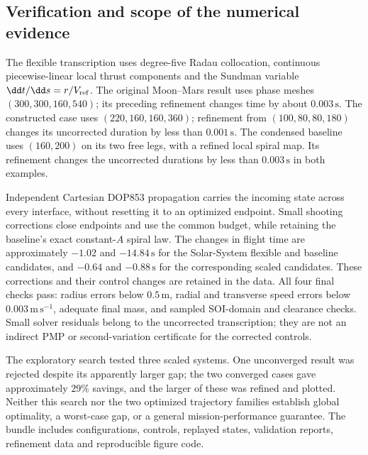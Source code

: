 \subsection{Verification and scope of the numerical evidence}
The flexible transcription uses degree-five Radau collocation, continuous piecewise-linear local thrust components and the Sundman variable $\dd t/\dd s=r/V_{\rm ref}$. The original Moon--Mars result uses phase meshes $(300,300,160,540)$; its preceding refinement changes time by about $0.003\,\mathrm s$. The constructed case uses $(220,160,160,360)$; refinement from $(100,80,80,180)$ changes its uncorrected duration by less than $0.001\,\mathrm s$. The condensed baseline uses $(160,200)$ on its two free legs, with a refined local spiral map. Its refinement changes the uncorrected durations by less than $0.003\,\mathrm s$ in both examples.

Independent Cartesian DOP853 propagation carries the incoming state across every interface, without resetting it to an optimized endpoint. Small shooting corrections close endpoints and use the common budget, while retaining the baseline's exact constant-$A$ spiral law. The changes in flight time are approximately $-1.02$ and $-14.84\,\mathrm s$ for the Solar-System flexible and baseline candidates, and $-0.64$ and $-0.88\,\mathrm s$ for the corresponding scaled candidates. These corrections and their control changes are retained in the data. All four final checks pass: radius errors below $0.5\,\mathrm m$, radial and transverse speed errors below $0.003\,\mathrm{m\,s^{-1}}$, adequate final mass, and sampled SOI-domain and clearance checks. Small solver residuals belong to the uncorrected transcription; they are not an indirect PMP or second-variation certificate for the corrected controls.

The exploratory search tested three scaled systems. One unconverged result was rejected despite its apparently larger gap; the two converged cases gave approximately $29\%$ savings, and the larger of these was refined and plotted. Neither this search nor the two optimized trajectory families establish global optimality, a worst-case gap, or a general mission-performance guarantee. The bundle includes configurations, controls, replayed states, validation reports, refinement data and reproducible figure code.
\clearpage
\twocolumn
\setlength{\abovedisplayskip}{6pt plus 2pt minus 2pt}
\setlength{\belowdisplayskip}{6pt plus 2pt minus 2pt}
\setlength{\abovedisplayshortskip}{3pt plus 1pt minus 1pt}
\setlength{\belowdisplayshortskip}{6pt plus 2pt minus 2pt}


